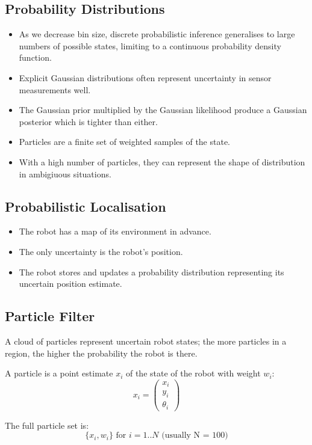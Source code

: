 \documentclass[11pt]{article}
\begin{document}
\subsection{Probability Distributions}
\begin{itemize}
  \item As we decrease bin size, discrete probabilistic inference generalises to large numbers of possible states, limiting to a continuous probability density function.
  \item Explicit Gaussian distributions often represent uncertainty in sensor measurements well.
  \item The Gaussian prior multiplied by the Gaussian likelihood produce a Gaussian posterior which is tighter than either.
  \item Particles are a finite set of weighted samples of the state.
  \item With a high number of particles, they can represent the shape of distribution in ambigiuous situations.
\end{itemize}

\subsection{Probabilistic Localisation}
\begin{itemize}
  \item The robot has a map of its environment in advance.
  \item The only uncertainty is the robot's position.
  \item The robot stores and updates a probability distribution representing its uncertain position estimate.
\end{itemize}

\subsection{Particle Filter}
A cloud of particles represent uncertain robot states; the more particles in a region, the higher the probability the robot is there.

A particle is a point estimate $x_i$ of the state of the robot with weight $w_i$:
\[
  x_i = 
  \begin{pmatrix}
    x_i \\
    y_i \\
    \theta_i
  \end{pmatrix}
\]

The full particle set is:
\[
  \{ x_i, w_i \} \text{ for } i = 1..N \text{ (usually N = 100)}
\]
\end{document}
